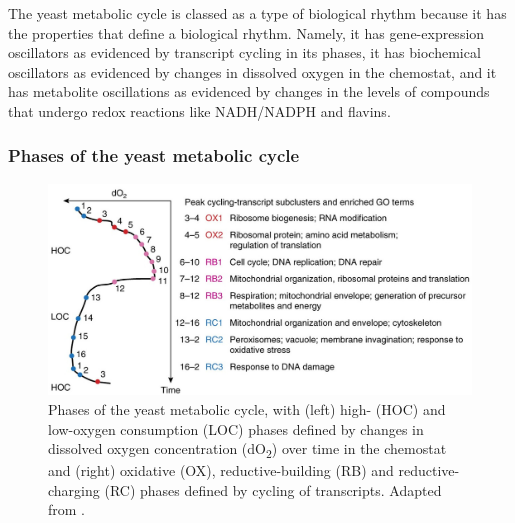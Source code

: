 The yeast metabolic cycle is classed as a type of biological rhythm because it has the properties that define a biological rhythm.
Namely, it has gene-expression oscillators as evidenced by transcript cycling in its phases,
it has biochemical oscillators as evidenced by changes in dissolved oxygen in the chemostat,
and it has metabolite oscillations as evidenced by changes in the levels of compounds that undergo redox reactions like NADH/NADPH and flavins.

\subsubsection{Phases of the yeast metabolic cycle}
\label{subsubsec:intro-ymc-definition-phases}

\begin{figure}
  \centering
  \includegraphics[width=1.0\textwidth]{mellorMolecularBasisMetabolic2016_3c_adapted}
  \caption[
    Phases of the yeast metabolic cycle
  ]{
    Phases of the yeast metabolic cycle,
    with (left) high- (HOC) and low-oxygen consumption (LOC) phases defined by changes in dissolved oxygen concentration (dO\textsubscript{2}) over time in the chemostat
    and (right) oxidative (OX), reductive-building (RB) and reductive-charging (RC) phases defined by cycling of transcripts.
    Adapted from \textcite{mellorMolecularBasisMetabolic2016}.}
  \label{fig:intro-ymc-overview}
\end{figure}

